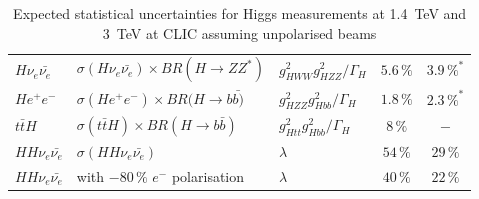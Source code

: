 \begin{table}
\begin{tabular}{lllcc}
    $H\nu_e\bar{\nu_e}$    & $\sigma(H\nu_e\bar{\nu_e})\times BR(H\rightarrow ZZ^*)$         & $g^{2}_{HWW}g_{HZZ}^{2}/\Gamma_H$  & $5.6\,\%$ & $3.9\,\%^*$   \\
    $He^+e^-$       & $\sigma(He^+e^-)\times BR(H\rightarrow b\bar{b)}$           & $g_{HZZ}^{2}g_{Hbb}^{2}/\Gamma_H$    & $1.8\,\%$ & $2.3\,\%^*$ \\ \midrule
    $t\bar{t}H$      & $\sigma(t\bar{t}H)\times BR(H\rightarrow b\bar{b})$          & $g_{Htt}^{2}g_{Hbb}^{2}/\Gamma_H$  & $8\,\%$         & $-$             \\
    $HH\nu_e\bar{\nu_e}$ & $\sigma(HH\nu_e\bar{\nu_e})$                               & $\lambda$                   & $54\,\%$          & $29\,\%$            \\
    $HH\nu_e\bar{\nu_e}$ & with $-80\,\%$ $e^-$ polarisation                             & $\lambda$                  & $40\,\%$          & $22\,\%$            \\ \bottomrule
  \end{tabular}
  \caption[Expected statistical uncertainties for Higgs measurements at 1.4~TeV and 3~TeV at CLIC assuming unpolarised beams]{Expected statistical uncertainties for Higgs measurements at 1.4~TeV and 3~TeV at CLIC assuming unpolarised beams \cite{Abramowicz:2016zbo}}
  \label{fig:HighENumbers}
\end{table}


